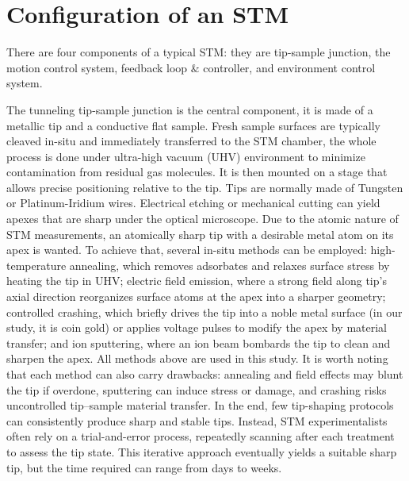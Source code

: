 \section{Configuration of an STM}
There are four components of a typical STM: they are tip-sample junction, the motion control system, feedback loop $\&$ controller, and environment control system. 

The tunneling tip-sample junction is the central component, it is made of a metallic tip and a conductive flat sample. Fresh sample surfaces are typically cleaved in-situ and immediately transferred to the STM chamber, the whole process is done under ultra-high vacuum (UHV) environment to minimize contamination from residual gas molecules. It is then mounted on a stage that allows precise positioning relative to the tip. Tips are normally made of Tungsten or Platinum-Iridium wires. Electrical etching or mechanical cutting can yield apexes that are sharp under the optical microscope. Due to the atomic nature of \ac{STM} measurements, an atomically sharp tip with a desirable metal atom on its apex is wanted. To achieve that, several in-situ methods can be employed: high-temperature annealing, which removes adsorbates and relaxes surface stress by heating the tip in UHV; electric field emission, where a strong field along tip's axial direction reorganizes surface atoms at the apex into a sharper geometry; controlled crashing, which briefly drives the tip into a noble metal surface (in our study, it is coin gold) or applies voltage pulses to modify the apex by material transfer; and ion sputtering, where an ion beam bombards the tip to clean and sharpen the apex. All methods above are used in this study. It is worth noting that each method can also carry drawbacks: annealing and field effects may blunt the tip if overdone, sputtering can induce stress or damage, and crashing risks uncontrolled tip–sample material transfer. In the end, few tip-shaping protocols can consistently produce sharp and stable tips. Instead, STM experimentalists often rely on a trial-and-error process, repeatedly scanning after each treatment to assess the tip state. This iterative approach eventually yields a suitable sharp tip, but the time required can range from days to weeks.



